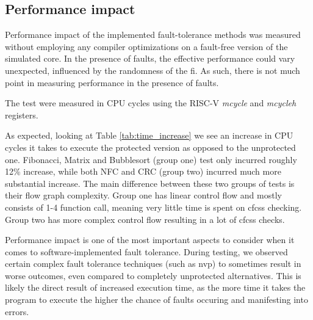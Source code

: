 \subsection{Performance impact}

Performance impact of the implemented fault-tolerance methods was measured without employing any compiler optimizations on a fault-free version of the simulated core. In the presence of faults, the effective performance could vary unexpected, influenced by the randomness of the \acrshort{fi}. As such, there is not much point in measuring performance in the presence of faults.

The test were measured in CPU cycles using the RISC-V \textit{mcycle} and \textit{mcycleh} registers.

\begin{table}[h]
\centering
{}
\caption{Execution time comparison between unprotected and protected tests}
\label{tab:time_increase}
\end{table}

As expected, looking at Table \ref{tab:time_increase} we see an increase in CPU cycles it takes to execute the protected version as opposed to the unprotected one. Fibonacci, Matrix and Bubblesort (group one) test only incurred roughly 12\% increase, while both NFC and CRC (group two) incurred much more substantial increase. The main difference between these two groups of tests is their flow graph complexity. Group one has linear control flow and mostly consists of 1-4 function call, meaning very little time is spent on \acrshort{cfcss} checking. Group two has more complex control flow resulting in a lot of \acrshort{cfcss} checks.

Performance impact is one of the most important aspects to consider when it comes to software-implemented fault tolerance. During testing, we observed certain complex fault tolerance techniques (such as \acrshort{nvp}) to sometimes result in worse outcomes, even compared to completely unprotected alternatives. This is likely the direct result of increased execution time, as the more time it takes the program to execute the higher the chance of faults occuring and manifesting into errors.

